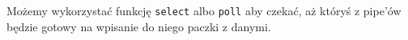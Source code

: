 Możemy wykorzystać funkcję \texttt{select} albo \texttt{poll} aby czekać, aż któryś z pipe'ów będzie gotowy na wpisanie do niego paczki z danymi.